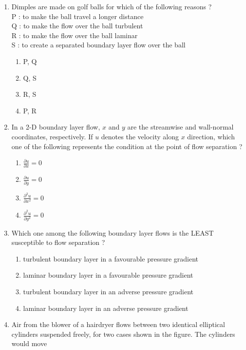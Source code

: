 \documentclass[journal]{IEEEtran}
\begin{document}
\begin{enumerate}
\item Dimples are made on golf balls for which of the following reasons ? \\
P : to make the ball travel a longer distance \\
Q : to make the flow over the ball turbulent \\
R : to make the flow over the ball laminar \\
S : to create a separated boundary layer flow over the ball
\begin{enumerate}
    \item P, Q
    \item Q, S
    \item R, S
    \item P, R \\
\end{enumerate}
\item In a 2-D boundary layer flow, $x$ and $y$ are the streamwise and wall-normal coordinates, respectively. If $u$ denotes the velocity along $x$ direction, which one of the following represents the condition at the point of flow separation ?
\begin{enumerate}
    \item $\frac{\partial u}{\partial x} = 0$
    \item $\frac{\partial u}{\partial y} = 0$
    \item $\frac{\partial^2 u}{\partial x^2} = 0$
    \item $\frac{\partial^2 u}{\partial y^2} = 0$ \\
\end{enumerate}
\item Which one among the following boundary layer flows is the LEAST susceptible to flow separation ?
\begin{enumerate}
    \item turbulent boundary layer in a favourable pressure gradient
    \item laminar boundary layer in a favourable pressure gradient
    \item turbulent boundary layer in an adverse pressure gradient
    \item laminar boundary layer in an adverse pressure gradient \\
\end{enumerate}
\item Air from the blower of a hairdryer flows between two identical elliptical cylinders suspended freely, for two cases shown in the figure. The cylinders would move 
\begin{figure}[!ht]

\end{figure}
\end{enumerate}
\end{document}
